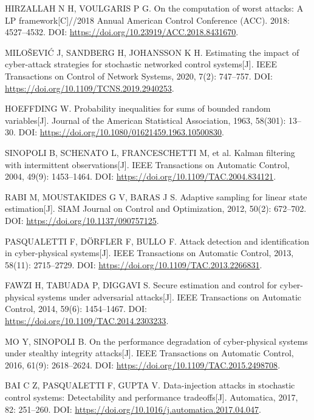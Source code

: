 HIRZALLAH N H, VOULGARIS P G.
On the computation of worst attacks: A LP framework[C]//2018 Annual American Control Conference (ACC).
2018: 4527--4532.
DOI: \url{https://doi.org/10.23919/ACC.2018.8431670}.

MILO\v SEVI\'C J, SANDBERG H, JOHANSSON K H.
Estimating the impact of cyber-attack strategies for stochastic networked control systems[J].
IEEE Transactions on Control of Network Systems, 2020, 7(2): 747--757.
DOI: \url{https://doi.org/10.1109/TCNS.2019.2940253}.

HOEFFDING W.
Probability inequalities for sums of bounded random variables[J].
Journal of the American Statistical Association, 1963, 58(301): 13--30.
DOI: \url{https://doi.org/10.1080/01621459.1963.10500830}.

SINOPOLI B, SCHENATO L, FRANCESCHETTI M, et al.
Kalman filtering with intermittent observations[J].
IEEE Transactions on Automatic Control, 2004, 49(9): 1453--1464.
DOI: \url{https://doi.org/10.1109/TAC.2004.834121}.

RABI M, MOUSTAKIDES G V, BARAS J S.
Adaptive sampling for linear state estimation[J].
SIAM Journal on Control and Optimization, 2012, 50(2): 672--702.
DOI: \url{https://doi.org/10.1137/090757125}.

PASQUALETTI F, D\"ORFLER F, BULLO F.
Attack detection and identification in cyber-physical systems[J].
IEEE Transactions on Automatic Control, 2013, 58(11): 2715--2729.
DOI: \url{https://doi.org/10.1109/TAC.2013.2266831}.

FAWZI H, TABUADA P, DIGGAVI S.
Secure estimation and control for cyber-physical systems under adversarial attacks[J].
IEEE Transactions on Automatic Control, 2014, 59(6): 1454--1467.
DOI: \url{https://doi.org/10.1109/TAC.2014.2303233}.

MO Y, SINOPOLI B.
On the performance degradation of cyber-physical systems under stealthy integrity attacks[J].
IEEE Transactions on Automatic Control, 2016, 61(9): 2618--2624.
DOI: \url{https://doi.org/10.1109/TAC.2015.2498708}.

BAI C Z, PASQUALETTI F, GUPTA V.
Data-injection attacks in stochastic control systems: Detectability and performance tradeoffs[J].
Automatica, 2017, 82: 251--260.
DOI: \url{https://doi.org/10.1016/j.automatica.2017.04.047}.

